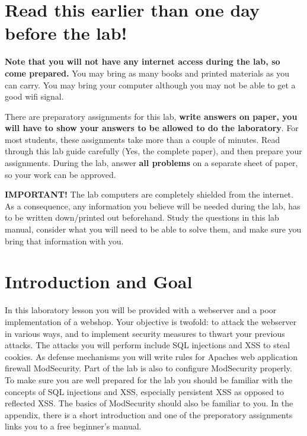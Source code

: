 \documentclass[EITN41]{../tex/cryptosecuritylab}
\begin{document}
\makecryptosecuritytitle

\section*{Read this earlier than one day before the lab!}

\textbf{Note that you will not have any internet access during the lab, so come prepared.} You may bring as many books and printed materials as you can carry. 
You may bring your computer although you may not be able to get a good wifi signal.

There are preparatory assignments for this lab, 
\textbf{write answers on paper, you will have to show your answers to be allowed to do the laboratory}.
For most students, these assignments take more than a couple of minutes.
Read through this lab guide carefully (Yes, the complete paper), 
and then prepare your assignments. During the lab, answer \textbf{all problems} 
on a separate sheet of paper, so your work can be approved. 

\textbf{IMPORTANT!} The lab computers are completely shielded from
the internet. As a consequence, any information you believe will be needed
during the lab, has to be written down/printed out beforehand.
Study the questions in this lab manual, consider what you will need
to be able to solve them, and make sure you bring that information with you.

\section*{Introduction and Goal}
In this laboratory lesson you will be provided with a webserver and a poor implementation of a webshop. 
Your objective is twofold: to attack the webserver in various ways, and to implement security measures to 
thwart your previous attacks. The attacks you will perform include SQL injections and XSS to steal cookies. 
As defense mechanisms you will write rules for Apaches web application firewall ModSecurity. 
Part of the lab is also to configure ModSecurity properly. To make sure you are well prepared for the lab 
you should be familiar with the concepts of SQL injections and XSS, especially persistent XSS as opposed to reflected XSS. 
The basics of ModSecurity should also be familiar to you. In the appendix, there is a short 
introduction and one of the preporatory assignments links you to a free beginner's manual.
\end{document}
